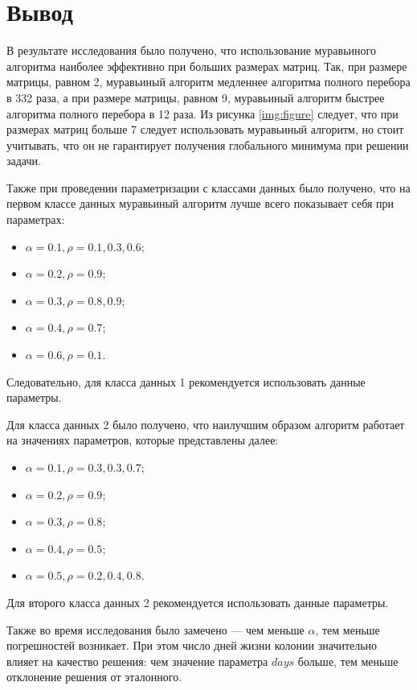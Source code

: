 \section*{Вывод}

В результате исследования было получено, что использование муравьиного алгоритма наиболее эффективно при больших размерах матриц. Так, при размере матрицы, равном 2, муравьиный алгоритм медленнее алгоритма полного перебора в 332 раза, а при размере матрицы, равном 9, муравьиный алгоритм быстрее алгоритма полного перебора в 12 раза. Из рисунка \ref{img:figure} следует, что при размерах матриц больше 7 следует использовать муравьиный алгоритм, но стоит учитывать, что он не гарантирует получения глобального минимума при решении задачи.

Также при проведении параметризации с классами данных было получено, что на первом классе данных муравьиный алгоритм лучше всего показывает себя при параметрах:
\begin{itemize}[label=---]
	\item $\alpha = 0.1, \rho = 0.1, 0.3, 0.6$;
	\item $\alpha = 0.2, \rho = 0.9$;
	\item $\alpha = 0.3, \rho = 0.8, 0.9$;
	\item $\alpha = 0.4, \rho = 0.7$;
	\item $\alpha = 0.6, \rho = 0.1$.
\end{itemize}  
Следовательно, для класса данных 1 рекомендуется использовать данные параметры. 

Для класса данных 2 было получено, что наилучшим образом алгоритм работает на значениях параметров, которые представлены далее:
\begin{itemize}[label=---]
	\item $\alpha = 0.1, \rho = 0.3, 0.3, 0.7$;
	\item $\alpha = 0.2, \rho = 0.9$;
	\item $\alpha = 0.3, \rho = 0.8$;
	\item $\alpha = 0.4, \rho = 0.5$;
	\item $\alpha = 0.5, \rho = 0.2, 0.4, 0.8$.
\end{itemize} 
Для второго класса данных 2 рекомендуется использовать данные параметры.

Также во время исследования было замечено --- чем меньше $\alpha$, тем меньше погрешностей возникает. При этом число дней жизни колонии значительно влияет на качество решения: чем значение параметра $days$ больше, тем меньше отклонение решения от эталонного.


